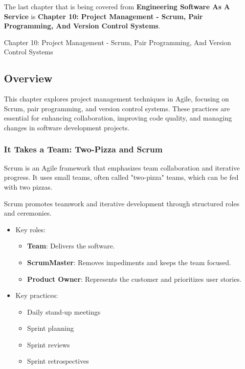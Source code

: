 The last chapter that is being covered from \textbf{Engineering Software As A Service} is \textbf{Chapter 10: Project Management - Scrum, Pair Programming, And Version Control Systems}.

\begin{notes}{Chapter 10: Project Management - Scrum, Pair Programming, And Version Control Systems}
    \subsection*{Overview}

    This chapter explores project management techniques in Agile, focusing on Scrum, pair programming, and version control systems. These practices are essential for enhancing collaboration, improving 
    code quality, and managing changes in software development projects.
    
    \subsubsection*{It Takes a Team: Two-Pizza and Scrum}
    
    Scrum is an Agile framework that emphasizes team collaboration and iterative progress. It uses small teams, often called "two-pizza" teams, which can be fed with two pizzas.
    
    \begin{highlight}
    
        Scrum promotes teamwork and iterative development through structured roles and ceremonies.
        
        \begin{itemize}
            \item Key roles:
            \begin{itemize}
                \item \textbf{Team}: Delivers the software.
                \item \textbf{ScrumMaster}: Removes impediments and keeps the team focused.
                \item \textbf{Product Owner}: Represents the customer and prioritizes user stories.
            \end{itemize}
            \item Key practices:
            \begin{itemize}
                \item Daily stand-up meetings
                \item Sprint planning
                \item Sprint reviews
                \item Sprint retrospectives
            \end{itemize}
        \end{itemize}
    

\end{highlight}
\end{notes}
